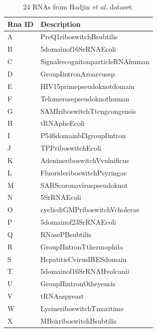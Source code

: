 \documentclass[11pt]{article} %
\newcommand\Heatset[1]{\pgfkeys{/heat, #1}}
\begin{document}
 \begin{table}[h]
\centering
\begin{adjustbox}{max width=1\textwidth}
 \begin{tabular}{@{}ll@{}}
 \toprule
Rna ID & Description\\
 \midrule
A	&	PreQ1riboswitchBsubtilis\\
B	&	5domainof16SrRNAEcoli\\
C	&	SignalrecognitonparticleRNAhuman\\
D	&	GroupIintronAzoarcussp\\
E	&	HIV15primepseudoknotdomain\\
F	&	Telomerasepseudoknothuman\\
G	&	SAMIriboswitchTtengcongensis\\
H	&	tRNApheEcoli\\
I	&	P546domainbI3groupIintron\\
J	&	TPPriboswitchEcoli\\
K	&	AdenineriboswitchVvulnificus\\
L	&	FluorideriboswitchPsyringae\\
M	&	SARScoronaviruspseudoknot\\
N	&	5SrRNAEcoli\\
O	&	cyclicdiGMPriboswitchVcholerae\\
P	&	5domainof23SrRNAEcoli\\
Q	&	RNasePBsubtilis\\
R	&	GroupIIntronTthermophila\\
S	&	HepatitisCvirusIRESdomain\\
T	&	5domainof16SrRNAHvolcanii\\
U	&	GroupIIintronOiheyensis\\
V	&	tRNAaspyeast\\
W	&	LysineriboswitchTmaritime\\
X	&	MBoxriboswitchBsubtilis\\
\bottomrule
\end{tabular}
\end{adjustbox}
\caption{24 RNAs from Hadjin \emph{ et al.} dataset.}
\label{clyu}


\end{table}
\end{document}
